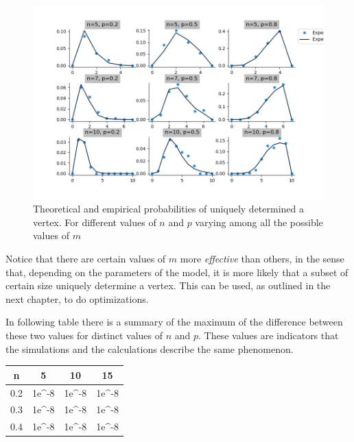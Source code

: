 \clearpage
\begin{figure}[h!]
	\centering
	\includegraphics[scale=0.55]{Python/Figures/Uniquely-determinated-fixed-vertex.png}
	\caption{Theoretical and empirical probabilities of uniquely determined a vertex. For different values of $n$ and $p$ varying among all the possible values of $m$}
\end{figure}

Notice that there are certain values of $m$ more \textit{effective} than others, in the sense that, depending on the parameters of the model, it is more likely that a subset of certain size uniquely determine a vertex. This can be used, as outlined in the next chapter, to do optimizations.
 
In following table there is a summary of the maximum of the difference between these two values for distinct values of $n$ and $p$. These values are indicators that the simulations and the calculations describe the same phenomenon.

\bgroup
\def\arraystretch{1.5}%
\begin{center}
\begin{tabular}{|c|c|c|c|}
\hline
n & 5 & 10 & 15 \\
\hline \hline
 0.2 & 1e^{-8} & 1e^{-8} & 1e^{-8} \\\hline
 0.3 & 1e^{-8} & 1e^{-8} & 1e^{-8} \\\hline
 0.4 & 1e^{-8} & 1e^{-8} & 1e^{-8} \\\hline
\end{tabular}
\caption{Maximums of differences between empirical and theoretical probabilities varying $m$ for different values of $n$ and $p$}
\label{tabla:sencilla}
\end{center}
\bgroup


